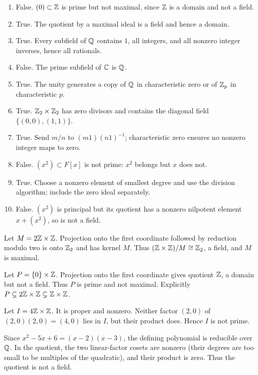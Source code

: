 \begin{enumerate}[label=(\alph*)]
\item False. $(0)\subset\mathbb{Z}$ is prime but not maximal, since $\mathbb{Z}$ is a domain and not a field.
\item True. The quotient by a maximal ideal is a field and hence a domain.
\item True. Every subfield of $\mathbb{Q}$ contains $1$, all integers, and all nonzero integer inverses, hence all rationals.
\item False. The prime subfield of $\mathbb{C}$ is $\mathbb{Q}$.
\item True. The unity generates a copy of $\mathbb{Q}$ in characteristic zero or of $\mathbb{Z}_p$ in characteristic $p$.
\item True. $\mathbb{Z}_2\times\mathbb{Z}_2$ has zero divisors and contains the diagonal field $\{(0,0),(1,1)\}$.
\item True. Send $m/n$ to $(m1)(n1)^{-1}$; characteristic zero ensures no nonzero integer maps to zero.
\item False. $(x^2)\subset F[x]$ is not prime: $x^2$ belongs but $x$ does not.
\item True. Choose a nonzero element of smallest degree and use the division algorithm; include the zero ideal separately.
\item False. $(x^2)$ is principal but its quotient has a nonzero nilpotent element $x+(x^2)$, so is not a field.
\end{enumerate}

Let $M=2\mathbb{Z}\times\mathbb{Z}$. Projection onto the first coordinate followed by reduction modulo two is onto $\mathbb{Z}_2$ and has kernel $M$. Thus $(\mathbb{Z}\times\mathbb{Z})/M\cong\mathbb{Z}_2$, a field, and $M$ is maximal.

Let $P=\{0\}\times\mathbb{Z}$. Projection onto the first coordinate gives quotient $\mathbb{Z}$, a domain but not a field. Thus $P$ is prime and not maximal. Explicitly $P\subsetneq2\mathbb{Z}\times\mathbb{Z}\subsetneq\mathbb{Z}\times\mathbb{Z}$.

Let $I=4\mathbb{Z}\times\mathbb{Z}$. It is proper and nonzero. Neither factor $(2,0)$ of $(2,0)(2,0)=(4,0)$ lies in $I$, but their product does. Hence $I$ is not prime.

Since $x^2-5x+6=(x-2)(x-3)$, the defining polynomial is reducible over $\mathbb{Q}$. In the quotient, the two linear-factor cosets are nonzero (their degrees are too small to be multiples of the quadratic), and their product is zero. Thus the quotient is not a field.

